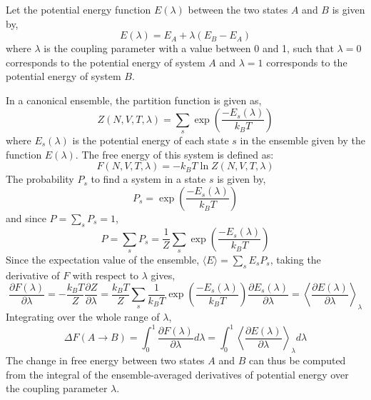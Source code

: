 \documentclass{article}
\begin{document}
{Let the potential energy function $E(\lambda)$ between the two states $A$ and $B$ is given by,
%
\begin{equation} \label{eq:59}
E(\lambda) = E_A + \lambda(E_B - E_A)
\end{equation}
%
where $\lambda$ is the coupling parameter with a value between 0 and 1, such that $\lambda=0$ corresponds to the potential energy of system $A$ and $\lambda=1$ corresponds to the potential energy of system $B$.

In a canonical ensemble, the partition function is given as,
%
\begin{equation} \label{eq:60}
Z(N,V,T,\lambda )=\sum _{s}\exp\left(\dfrac{-E_s(\lambda )}{k_BT}\right)
\end{equation}
%
where $E_s(\lambda)$ is the potential energy of each state $s$ in the ensemble given by the function $E(\lambda)$. The free energy of this system is defined as:
%
\begin{equation} \label{eq:61}
F(N,V,T,\lambda )=-k_BT\ln Z(N,V,T,\lambda)
\end{equation}
The probability $P_s$ to find a system in a state $s$ is given by,
%
\begin{equation} \label{eq:62}
P_s =\exp\left(\dfrac{-E_s(\lambda )}{k_BT}\right)
\end{equation}
%
and since $P = \sum_s P_s =1$,
%
\begin{equation} \label{eq:63}
P = \sum_s P_s =\dfrac{1}{Z}\sum_s\exp\left(\dfrac{-E_s(\lambda )}{k_BT}\right)
\end{equation}
%
Since the expectation value of the ensemble, $\langle E \rangle = \sum_s E_s P_s$, taking the derivative of $F$ with respect to $\lambda$ gives,
%
\begin{equation} \label{eq:64}
\frac {\partial F(\lambda )}{\partial \lambda} = -\frac {k_BT}{Z}\frac {\partial Z}{\partial \lambda} = \frac {k_BT}{Z}\sum _{s}{\frac {1}{k_BT}}\exp\left(\dfrac{-E_{s}(\lambda)}{k_BT}\right)\frac {\partial E_{s}(\lambda)}{\partial \lambda} = \left\langle {\frac {\partial E(\lambda )}{\partial \lambda }}\right\rangle _{\lambda }
\end{equation}
%
Integrating over the whole range of $\lambda$, 
%
\begin{equation} \label{eq:65}
 \Delta F(A\rightarrow B)=\int _{0}^{1}{\frac {\partial F(\lambda )}{\partial \lambda}}d\lambda =\int _{0}^{1}\left\langle {\frac {\partial E(\lambda )}{\partial \lambda }}\right\rangle _{\lambda }d\lambda
\end{equation}
%
The change in free energy between two states $A$ and $B$ can thus be computed from the integral of the ensemble-averaged derivatives of potential energy over the coupling parameter $\lambda$.

}
\end{document}
